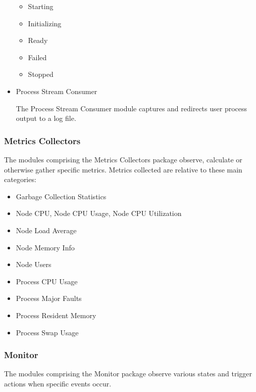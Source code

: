 \begin{itemize}
         \begin{itemize}
           \item Starting
           \item Initializing
           \item Ready
           \item Failed
           \item Stopped
         \end{itemize}
         
      \item Process Stream Consumer
      
      The Process Stream Consumer module captures and redirects user process output
      to a log file.
      
    \end{itemize}  
    
    \subsubsection{Metrics Collectors} 
    
    The modules comprising the Metrics Collectors package observe, calculate
    or otherwise gather specific metrics. Metrics collected are relative to
    these main categories:
        
    \begin{itemize}
      \item Garbage Collection Statistics
      \item Node CPU, Node CPU Usage, Node CPU Utilization
      \item Node Load Average
      \item Node Memory Info
      \item Node Users
      \item Process CPU Usage
      \item Process Major Faults
      \item Process Resident Memory
      \item Process Swap Usage
    \end{itemize}  
    
    \subsubsection{Monitor} 

    The modules comprising the Monitor package observe various states and
    trigger actions when specific events occur.
        

